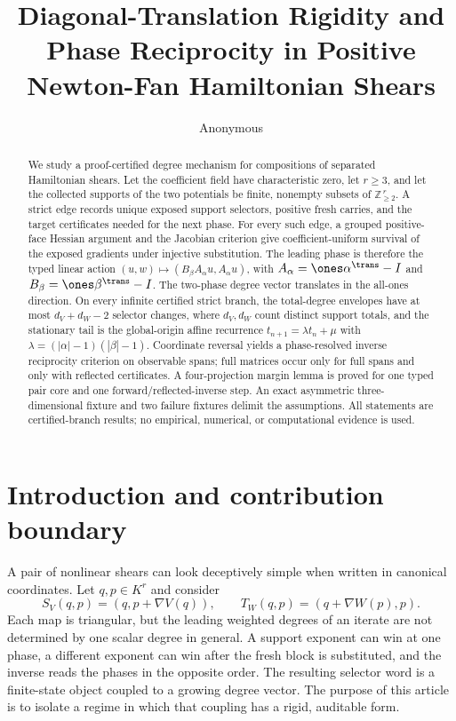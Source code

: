 \documentclass[11pt]{article}
\title{Diagonal-Translation Rigidity and Phase Reciprocity in Positive Newton-Fan Hamiltonian Shears}
\author{Anonymous}
\date{}
\theoremstyle{definition}
\theoremstyle{remark}
\begin{document}
\maketitle

\begin{abstract}
We study a proof-certified degree mechanism for compositions of separated
Hamiltonian shears.  Let the coefficient field have characteristic zero, let
$r\geq 3$, and let the collected supports of the two potentials be finite,
nonempty subsets of $\mathbb Z_{\geq 2}^{\,r}$.  A strict edge records unique
exposed support selectors, positive fresh carries, and the target
certificates needed for the next phase.  For every such edge, a grouped
positive-face Hessian argument and the Jacobian criterion give
coefficient-uniform survival of the exposed gradients under injective
substitution.  The leading phase is therefore the typed linear action
$(u,w)\mapsto(B_\beta A_\alpha u,A_\alpha u)$, with
$A_\alpha=\ones\alpha^{\trans}-I$ and
$B_\beta=\ones\beta^{\trans}-I$.  The two-phase degree vector translates in
the all-ones direction.  On every infinite certified strict branch, the
total-degree envelopes have at most $d_V+d_W-2$ selector changes, where
$d_V,d_W$ count distinct support totals, and the stationary tail is the
global-origin affine recurrence
$t_{n+1}=\lambda t_n+\mu$ with
$\lambda=(|\alpha|-1)(|\beta|-1)$.  Coordinate reversal yields a
phase-resolved inverse reciprocity criterion on observable spans; full
matrices occur only for full spans and only with reflected certificates.  A
four-projection margin lemma is proved for one typed pair core and one
forward/reflected-inverse step.  An exact asymmetric three-dimensional
fixture and two failure fixtures delimit the assumptions.  All statements
are certified-branch results; no empirical, numerical, or computational
evidence is used.
\end{abstract}

\section{Introduction and contribution boundary}

A pair of nonlinear shears can look deceptively simple when written in
canonical coordinates.  Let $q,p\in K^r$ and consider
\[
 S_V(q,p)=(q,p+\nabla V(q)),\qquad
 T_W(q,p)=(q+\nabla W(p),p).
\]
Each map is triangular, but the leading weighted degrees of an iterate are
not determined by one scalar degree in general.  A support exponent can win
at one phase, a different exponent can win after the fresh block is
substituted, and the inverse reads the phases in the opposite order.  The
resulting selector word is a finite-state object coupled to a growing
degree vector.  The purpose of this article is to isolate a regime in which
that coupling has a rigid, auditable form.
\end{document}
